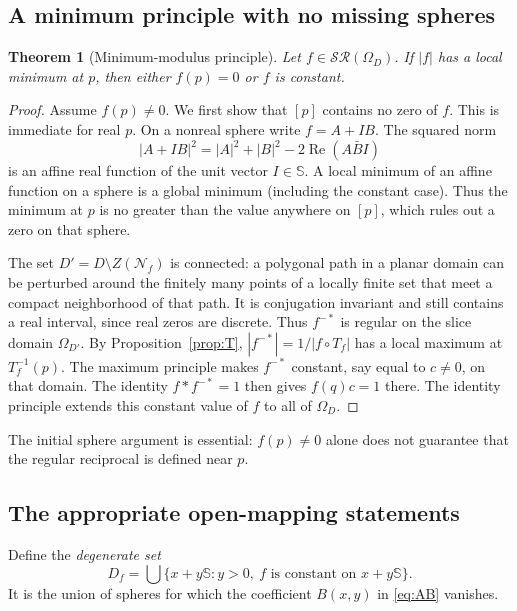 \documentclass[11pt,a4paper]{article}
\numberwithin{equation}{section}
\newtheorem{theorem}{Theorem}[section]
\theoremstyle{definition}
\theoremstyle{remark}
\newcommand{\SSS}{\mathbb S}
\newcommand{\Rea}{\operatorname{Re}}
\newcommand{\SR}{\mathcal{SR}}
\newcommand{\Norm}{\mathcal N}
\begin{document}
\subsection{A minimum principle with no missing spheres}
\begin{theorem}[Minimum-modulus principle]
\label{thm:min}
Let $f\in\SR(\Omega_D)$. If $|f|$ has a local minimum at $p$, then either
$f(p)=0$ or $f$ is constant.
\end{theorem}
\begin{proof}
Assume $f(p)\ne0$. We first show that $[p]$ contains no zero of $f$.
This is immediate for real $p$. On a nonreal sphere write $f=A+IB$.
The squared norm
\[
 |A+IB|^2=|A|^2+|B|^2-2\Rea(A\bar B I)
\]
is an affine real function of the unit vector $I\in\SSS$.
A local minimum of an affine function on a sphere is a global minimum
(including the constant case). Thus the minimum at $p$ is no greater than
the value anywhere on $[p]$, which rules out a zero on that sphere.

The set $D'=D\setminus Z(\Norm_f)$ is connected: a polygonal path in a planar
domain can be perturbed around the finitely many points of a locally finite
set that meet a compact neighborhood of that path. It is conjugation
invariant and still contains a real interval, since real zeros are discrete.
Thus $f^{-*}$ is regular on the slice domain $\Omega_{D'}$.
By Proposition~\ref{prop:T}, $|f^{-*}|=1/|f\circ T_f|$ has a local maximum at
$T_f^{-1}(p)$. The maximum principle makes $f^{-*}$ constant, say equal to
$c\ne0$, on that domain. The identity $f*f^{-*}=1$ then gives
$f(q)c=1$ there. The identity principle extends this constant value of $f$
to all of $\Omega_D$.
\end{proof}
The initial sphere argument is essential: $f(p)\ne0$ alone does not guarantee
that the regular reciprocal is defined near $p$.

\subsection{The appropriate open-mapping statements}
Define the \emph{degenerate set}
\[
 D_f=\bigcup\{x+y\SSS:y>0,\ f\text{ is constant on }x+y\SSS\}.
\]
It is the union of spheres for which the coefficient $B(x,y)$ in
\eqref{eq:AB} vanishes.
\end{document}
